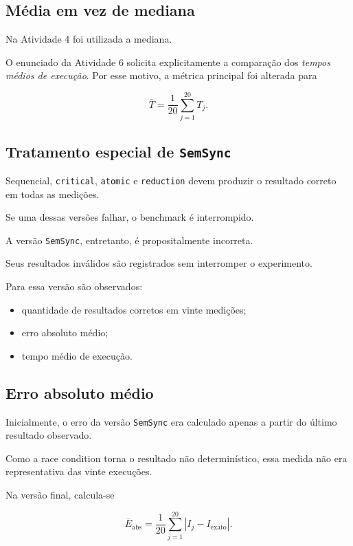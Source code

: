 \subsection{Média em vez de mediana}

Na Atividade 4 foi utilizada a mediana.

O enunciado da Atividade 6 solicita explicitamente a comparação dos
\emph{tempos médios de execução}. Por esse motivo, a métrica principal foi
alterada para

\begin{equation}
    \overline{T}
    =
    \frac{1}{20}
    \sum_{j=1}^{20}T_j.
\end{equation}


\subsection{Tratamento especial de \texttt{SemSync}}

Sequencial, \texttt{critical}, \texttt{atomic} e \texttt{reduction} devem
produzir o resultado correto em todas as medições.

Se uma dessas versões falhar, o benchmark é interrompido.

A versão \texttt{SemSync}, entretanto, é propositalmente incorreta.

Seus resultados inválidos são registrados sem interromper o experimento.

Para essa versão são observados:

\begin{itemize}
    \item quantidade de resultados corretos em vinte medições;
    \item erro absoluto médio;
    \item tempo médio de execução.
\end{itemize}


\subsection{Erro absoluto médio}

Inicialmente, o erro da versão \texttt{SemSync} era calculado apenas a partir
do último resultado observado.

Como a race condition torna o resultado não determinístico, essa medida não
era representativa das vinte execuções.

Na versão final, calcula-se

\begin{equation}
    \overline{E}_{\text{abs}}
    =
    \frac{1}{20}
    \sum_{j=1}^{20}
    \left|
        I_j-I_{\text{exato}}
    \right|.
    \label{eq:atvd06-erro-medio}
\end{equation}

